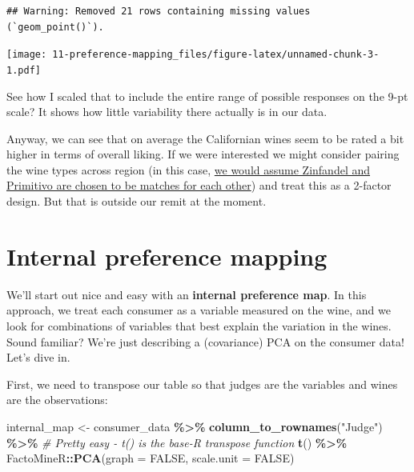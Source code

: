 \documentclass[
]{book}
\newenvironment{Shaded}{\begin{snugshade}}{\end{snugshade}}
\newcommand{\AttributeTok}[1]{\textcolor[rgb]{0.13,0.29,0.53}{#1}}
\newcommand{\CommentTok}[1]{\textcolor[rgb]{0.56,0.35,0.01}{\textit{#1}}}
\newcommand{\ConstantTok}[1]{\textcolor[rgb]{0.56,0.35,0.01}{#1}}
\newcommand{\FunctionTok}[1]{\textcolor[rgb]{0.13,0.29,0.53}{\textbf{#1}}}
\newcommand{\NormalTok}[1]{#1}
\newcommand{\OtherTok}[1]{\textcolor[rgb]{0.56,0.35,0.01}{#1}}
\newcommand{\SpecialCharTok}[1]{\textcolor[rgb]{0.81,0.36,0.00}{\textbf{#1}}}
\newcommand{\StringTok}[1]{\textcolor[rgb]{0.31,0.60,0.02}{#1}}
\begin{document}
\begin{verbatim}
## Warning: Removed 21 rows containing missing values (`geom_point()`).
\end{verbatim}

\texttt{[image: 11-preference-mapping\_files/figure-latex/unnamed-chunk-3-1.pdf]}

See how I scaled that to include the entire range of possible responses on the 9-pt scale? It shows how little variability there actually is in our data.

Anyway, we can see that on average the Californian wines seem to be rated a bit higher in terms of overall liking. If we were interested we might consider pairing the wine types across region (in this case, \href{https://en.wikipedia.org/wiki/Zinfandel}{we would assume Zinfandel and Primitivo are chosen to be matches for each other}) and treat this as a 2-factor design. But that is outside our remit at the moment.

\section{Internal preference mapping}\label{internal-preference-mapping}

We'll start out nice and easy with an \textbf{internal preference map}. In this approach, we treat each consumer as a variable measured on the wine, and we look for combinations of variables that best explain the variation in the wines. Sound familiar? We're just describing a (covariance) PCA on the consumer data! Let's dive in.

First, we need to transpose our table so that judges are the variables and wines are the observations:

\begin{Shaded}
\begin{Highlighting}[]
\NormalTok{internal\_map }\OtherTok{\textless{}{-}} 
\NormalTok{  consumer\_data }\SpecialCharTok{\%\textgreater{}\%}
  \FunctionTok{column\_to\_rownames}\NormalTok{(}\StringTok{"Judge"}\NormalTok{) }\SpecialCharTok{\%\textgreater{}\%}
  \CommentTok{\# Pretty easy {-} \textasciigrave{}t()\textasciigrave{} is the base{-}\textasciigrave{}R\textasciigrave{} transpose function}
  \FunctionTok{t}\NormalTok{() }\SpecialCharTok{\%\textgreater{}\%}
\NormalTok{  FactoMineR}\SpecialCharTok{::}\FunctionTok{PCA}\NormalTok{(}\AttributeTok{graph =} \ConstantTok{FALSE}\NormalTok{, }\AttributeTok{scale.unit =} \ConstantTok{FALSE}\NormalTok{)}
\end{Highlighting}
\end{Shaded}
\end{document}
